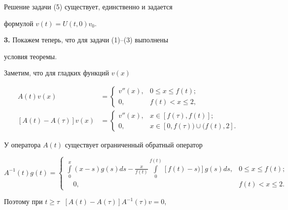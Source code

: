 




Решение задачи (5) существует, единственно и задается


формулой $v(t)=U(t,0)v_0$.


\medskip





{\bf 3.} Покажем теперь, что для задачи (1)--(3) выполнены


условия теоремы.


Заметим, что для гладких функций $v(x)$


\begin{align*}


A(t)v(x)&=


\begin{cases}


v''(x), & 0\le x\le f(t);\\


0, & f(t)<x\le 2,


\end{cases}


\\


[A(t)-A(\tau)]v(x)&=


\begin{cases}


v''(x), & x\in [f(\tau),f(t)];\\


0, & x\in [0,f(\tau))\cup (f(t),2].


\end{cases}


\end{align*}





У оператора $A(t)$ существует ограниченный обратный оператор


$$


A^{-1}(t)g(t)=


\begin{cases}


\int\limits^x_0(x-s)g(s)ds-\frac{x}{f(t)}


\int\limits^{f(t)}_0[f(t)-s)]g(s)ds, & 0\le x\le f(t);\\


\quad 0, & f(t)<x\le 2.


\end{cases}


$$


Поэтому при $t\ge\tau\;$ $[A(t)-A(\tau)]A^{-1}(\tau)v=0$,


